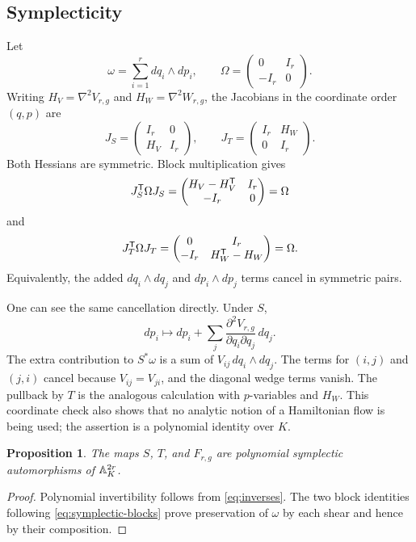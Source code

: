\documentclass[11pt]{article}
\newtheorem{proposition}[theorem]{Proposition}
\theoremstyle{remark}
\numberwithin{equation}{section}
\begin{document}
\subsection{Symplecticity}

Let
\[
\omega=\sum_{i=1}^{r}dq_i\wedge dp_i,\qquad
\Omega=\begin{pmatrix}0&I_r\\-I_r&0\end{pmatrix}.
\]
Writing \(H_V=\nabla^2V_{r,g}\) and \(H_W=\nabla^2W_{r,g}\), the Jacobians
in the coordinate order \((q,p)\) are
\begin{equation}\label{eq:symplectic-blocks}
J_S=\begin{pmatrix}I_r&0\\H_V&I_r\end{pmatrix},
\qquad
J_T=\begin{pmatrix}I_r&H_W\\0&I_r\end{pmatrix}.
\end{equation}
Both Hessians are symmetric.  Block multiplication gives
\[
J_S^{\mathsf{T}}\Omega J_S
=\begin{pmatrix}H_V-H_V^{\mathsf{T}}&I_r\\-I_r&0\end{pmatrix}
=\Omega
\]
and
\[
J_T^{\mathsf{T}}\Omega J_T
=\begin{pmatrix}0&I_r\\-I_r&H_W^{\mathsf{T}}-H_W\end{pmatrix}
=\Omega.
\]
Equivalently, the added \(dq_i\wedge dq_j\) and \(dp_i\wedge dp_j\) terms
cancel in symmetric pairs.

One can see the same cancellation directly.  Under \(S\),
\[
dp_i\longmapsto dp_i+\sum_j
\frac{\partial^2V_{r,g}}{\partial q_i\partial q_j}\,dq_j.
\]
The extra contribution to \(S^*\omega\) is a sum of
\(V_{ij}\,dq_i\wedge dq_j\).  The terms for \((i,j)\) and \((j,i)\)
cancel because \(V_{ij}=V_{ji}\), and the diagonal wedge terms vanish.
The pullback by \(T\) is the analogous calculation with \(p\)-variables and
\(H_W\).  This coordinate check also shows that no analytic notion of a
Hamiltonian flow is being used; the assertion is a polynomial identity over
\(K\).

\begin{proposition}\label{prop:symplectic}
The maps \(S\), \(T\), and \(F_{r,g}\) are polynomial symplectic
automorphisms of \(\mathbb{A}_K^{2r}\).
\end{proposition}

\begin{proof}
Polynomial invertibility follows from \eqref{eq:inverses}.  The two block
identities following \eqref{eq:symplectic-blocks} prove preservation of
\(\omega\) by each shear and hence by their composition.
\end{proof}
\end{document}

